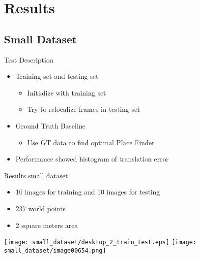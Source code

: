 
\section{Results}
\subsection{Small Dataset}
\label{sub:small_dataset}

\begin{frame}[t]{Test Description}
  \begin{itemize}
    \item Training set and testing set
      \begin{itemize}
        \item Initialize with training set
        \item Try to relocalize frames in testing set
      \end{itemize}
    \item Ground Truth Baseline 
      \begin{itemize}
        \item Use GT data to find optimal Place Finder
      \end{itemize}
    \item Performance showed histogram of translation error
  \end{itemize}


  
\end{frame}



\begin{frame}[t]{Results small dataset}
  \begin{itemize}
    \item 10 images for training and 10 images for testing
    \item 237 world points
    \item 2 square meters area
  \end{itemize}
      \texttt{[image: small\_dataset/desktop\_2\_train\_test.eps]}
      \texttt{[image: small\_dataset/image00654.png]}
  
\end{frame}


